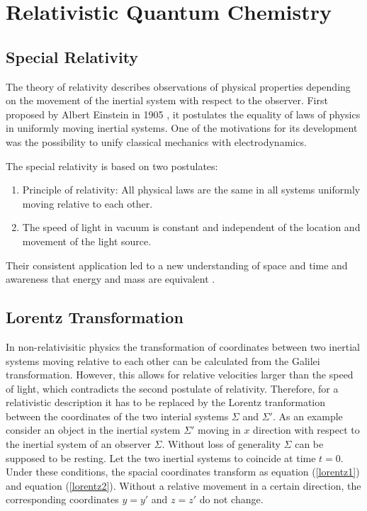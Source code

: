 \chapter{Relativistic Quantum Chemistry}
\label{chapter:relativistic}
\section{Special Relativity}

The theory of relativity describes observations of physical properties
depending on the movement
of the inertial system with respect to the observer.
First proposed
by Albert Einstein in 1905 \cite{Einstein05}, it postulates the equality of
laws of physics in uniformly moving inertial systems.
One of the motivations for its development was the possibility to unify
classical mechanics with electrodynamics.

The special relativity is based on two postulates:
\begin{enumerate}
\item Principle of relativity: All physical laws are the same in all 
      systems uniformly
      moving relative to each other.
\item The speed of light in vacuum is constant and independent of the location
      and movement of the light source.
\end{enumerate}

Their consistent application led to a new understanding of space and time
and awareness that energy and mass are equivalent \cite{nolting4}.


\section{Lorentz Transformation}
In non-relativisitic physics the transformation of coordinates between two
inertial systems moving relative to each other can be calculated from the
Galilei transformation. However, this allows for relative velocities larger
than the speed of light, which contradicts the second postulate of relativity.
Therefore, for a relativistic description it has to be replaced by the Lorentz
tranformation between the coordinates of the two interial
systems $\Sigma$ and $\Sigma'$.
As an example consider an object in the inertial system $\Sigma'$ moving
in $x$ direction with respect to the inertial system of an observer $\Sigma$.
Without loss of generality $\Sigma$ can be supposed to be resting.
Let the two 
inertial systems to coincide at time $t=0$. Under these conditions, the spacial
coordinates transform as equation (\ref{lorentz1}) and equation (\ref{lorentz2}).
Without a relative movement in a certain direction, the corresponding coordinates
$y=y'$ and $z=z'$ do not change.

